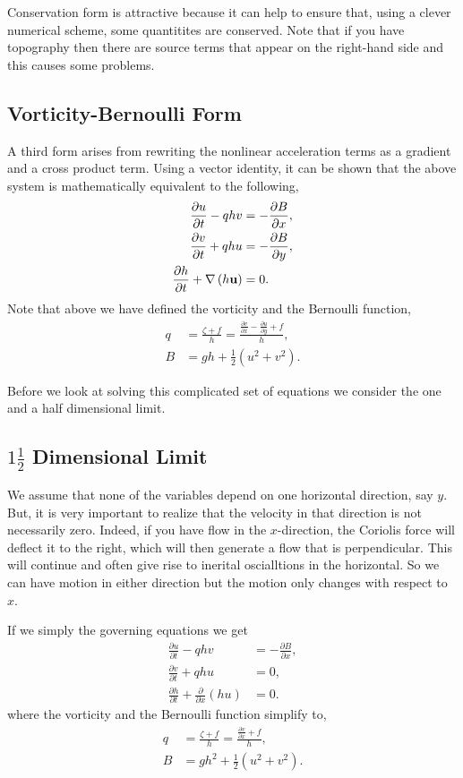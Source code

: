 \documentclass[11pt]{article}
\begin{document}
Conservation form is attractive because it can help to ensure that, using a clever numerical
scheme, some quantitites are conserved.  Note that if you have topography then there
are source terms that appear on the right-hand side and this causes some problems.

\subsection*{Vorticity-Bernoulli Form}

A third form arises from rewriting the nonlinear 
acceleration terms as a gradient and a cross product term.  Using a vector identity,
it can be shown that the above system is mathematically equivalent to the following,
\begin{align} 
\frac{\partial u}{\partial t}  - q h v 
&= - \frac{\partial B}{\partial x},\\
\frac{\partial v}{\partial t}  + q h u 
&= - \frac{\partial B}{\partial y},\\
\frac{\partial h}{\partial t} + \nabla \left( h \bf{u} \right) &= 0.
\end{align}
Note that above we have defined the vorticity and the Bernoulli function,
\begin{align}
q &= \frac{\zeta + f}{h} 
 = \frac{\frac{\partial v}{\partial x} - \frac{\partial u}{\partial y} + f}{h},\\
B & = g h + \frac12 \left( u^2 + v^2 \right).
\end{align}

Before we look at solving this complicated set of equations we consider the one and a half dimensional limit.

\subsection*{$1 \frac{1}{2}$ Dimensional Limit}

We assume that none of the variables depend on one horizontal direction, say $y$. 
But, it is very important to realize that the velocity in that direction is not necessarily zero.
Indeed, if you have flow in the $x$-direction, the Coriolis force will deflect it to the right,
which will then generate a flow that is perpendicular.  This will continue and often give rise
to inerital oscialltions in the horizontal.  So we can have motion in either direction but
the motion only changes with respect to $x$.  

If we simply the governing equations we get
\begin{align} 
\frac{\partial u}{\partial t}  - q h v 
&= - \frac{\partial B}{\partial x},\\
\frac{\partial v}{\partial t}  + q h u 
&= 0,\\
\frac{\partial h}{\partial t} + \frac{\partial}{\partial x} \left( h u \right) &= 0.
\end{align}
where the vorticity and the Bernoulli function simplify to,
\begin{align}
q & = \frac{\zeta + f}{h} = \frac{\frac{\partial v}{\partial x} + f}{h},\\
B & = g h^2 + \frac12 \left( u^2 + v^2 \right).
\end{align}
\end{document}
